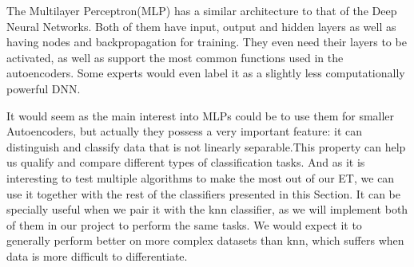 The Multilayer Perceptron(MLP) has a similar architecture to that of the Deep Neural Networks. Both of them have input, output and hidden layers as well as having nodes and backpropagation for training. They even need their layers to be activated, as well as support the most common functions used in the autoencoders. Some experts would even label it as a slightly less computationally powerful DNN. \par

It would seem as the main interest into MLPs could be to use them for smaller Autoencoders, but actually they possess a very important feature: it can distinguish and classify data that is not linearly separable.This property can help us qualify and compare different types of classification tasks. And as it is interesting to test multiple algorithms to make the most out of our ET, we can use it together with the rest of the classifiers presented in this Section. It can be specially useful when we pair it with the knn classifier, as we will implement both of them in our project to perform the same tasks. We would expect it to generally perform better on more complex datasets than knn, which suffers when data is more difficult to differentiate. \par
